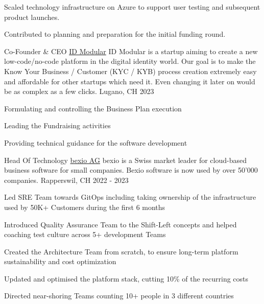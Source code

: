\begin{cventries}
{\begin{cvitems}
      \item {Scaled technology infrastructure on Azure to support user testing and subsequent product launches.}
      \item {Contributed to planning and preparation for the initial funding round.}
    \end{cvitems}
  }
  \cventry
    {Co-Founder \& CEO} %
    {\href{https://www.idmodular.com}{ID Modular}} %
    {ID Modular is a startup aiming to create a new low-code/no-code platform in the digital identity world. Our goal is to make the Know Your Business / Customer (KYC / KYB) process creation extremely easy and affordable for other startups which need it. Even changing it later on would be as complex as a few clicks.} %
    {Lugano, CH} %
    {2023} %
    {
      \begin{cvitems} %
        \item {Formulating and controlling the Business Plan execution}
        \item {Leading the Fundraising activities}
        \item {Providing technical guidance for the software development}
      \end{cvitems}
    }
  \cventry
    {Head Of Technology} %
    {\href{https://www.bexio.com}{bexio AG}} %
    {bexio is a Swiss market leader for cloud-based business software for small companies. Bexio software is now used by over 50'000 companies.} %
    {Rapperswil, CH} %
    {2022 - 2023} %
    {
      \begin{cvitems} %
        \item {Led SRE Team towards GitOps including taking ownership of the infrastructure used by 50K+ Customers during the first 6 months}
        \item {Introduced Quality Assurance Team to the Shift-Left concepts and helped coaching test culture across 5+ development Teams}
        \item {Created the Architecture Team from scratch, to ensure long-term platform sustainability and cost optimization}
        \item {Updated and optimised the platform stack, cutting 10\% of the recurring costs}
        \item {Directed near-shoring Teams counting 10+ people in 3 different countries}
      \end{cvitems}
    }


\end{cventries}
